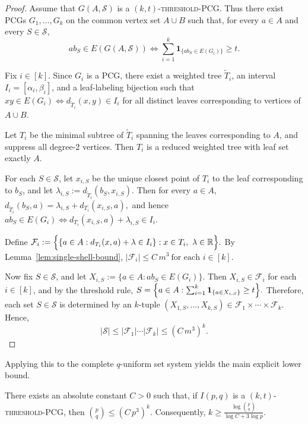 \documentclass[a4paper,UKenglish,cleveref,autoref,thm-restate]{socg-lipics-v2021}
\begin{document}
\begin{proof}
Assume that $G(A,\mathcal S)$ is a \textsc{$(k,t)$-threshold-\textsc{PCG}}. Thus there
exist \textsc{PCG}s
\(
G_1,\dots,G_k
\)
on the common vertex set $A\cup B$ such that, for every $a\in A$ and every
$S\in\mathcal S$,
\[
ab_S\in E(G(A,\mathcal S))
\iff
\sum_{i=1}^k \mathbf 1_{\{ab_S\in E(G_i)\}} \ge t.
\]

Fix $i\in[k]$. Since $G_i$ is a \textsc{PCG}, there exist a weighted tree
$\widetilde T_i$, an interval $I_i=[\alpha_i,\beta_i]$, and a leaf-labeling bijection
such that
\(
xy\in E(G_i)
\iff
d_{\widetilde T_i}(x,y)\in I_i
\)
for all distinct leaves corresponding to vertices of $A\cup B$.

Let $T_i$ be the minimal subtree of $\widetilde T_i$ spanning the leaves corresponding
to $A$, and suppress all degree-$2$ vertices. Then $T_i$ is a reduced weighted tree with
leaf set exactly $A$.

For each $S\in\mathcal S$, let $x_{i,S}$ be the unique closest point of $T_i$ to the
leaf corresponding to $b_S$, and let
\(
\lambda_{i,S}:=d_{\widetilde T_i}(b_S,x_{i,S}).
\)
Then for every $a\in A$,
\(
d_{\widetilde T_i}(b_S,a)=\lambda_{i,S}+d_{T_i}(x_{i,S},a),
\)
and hence
\(
ab_S\in E(G_i)
\iff
d_{T_i}(x_{i,S},a)+\lambda_{i,S}\in I_i.
\)

Define
\(
\mathcal F_i:=
\Bigl\{
\{a\in A:d_{T_i}(x,a)+\lambda\in I_i\}: x\in T_i,\ \lambda\in\mathbb R
\Bigr\}.
\)
By Lemma~\ref{lem:single-shell-bound},
\(
|\mathcal F_i|\le C\,m^3
\ \text{for each }i\in[k].
\)

Now fix $S\in\mathcal S$, and let
\(
X_{i,S}:=\{a\in A:ab_S\in E(G_i)\}.
\)
Then $X_{i,S}\in\mathcal F_i$ for each $i\in[k]$, and by the threshold rule,
\(
S=
\Bigl\{
a\in A:
\sum_{i=1}^k \mathbf 1_{\{a\in X_{i,S}\}} \ge t
\Bigr\}.
\)
Therefore, each set $S\in\mathcal S$ is determined by an $k$-tuple
\(
(X_{1,S},\dots,X_{k,S})\in \mathcal F_1\times\cdots\times\mathcal F_k.
\)
Hence,
\[
|\mathcal S|
\le
|\mathcal F_1|\cdots |\mathcal F_k|
\le
(C\,m^3)^k.
\] \end{proof}

Applying this to the complete $q$-uniform set system yields the main explicit lower
bound.

\begin{corollary}\label{cor:threshold-incidence}
There exists an absolute constant $C>0$ such that, if $I(p,q)$ is a
\textsc{$(k,t)$-threshold-\textsc{PCG}}, then
\(
\binom{p}{q}\le (C\,p^3)^k.
\)
Consequently,
\(
k\ge \frac{\log \binom{p}{q}}{\log C + 3\log p}.
\)
\end{corollary}
\end{document}
